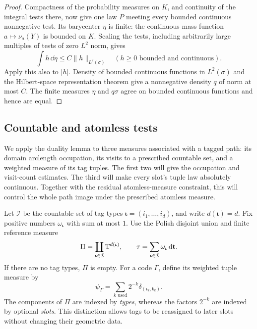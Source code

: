 \begin{proof}
Compactness of the probability measures on \(K\), and continuity of the
integral tests there, now give one law \(P\) meeting every bounded continuous
nonnegative test.  Its barycenter \(\eta\) is finite: the continuous mass
function \(a\mapsto\nu_a(Y)\) is bounded on \(K\).  Scaling the tests,
including arbitrarily large multiples of tests of zero \(L^2\) norm, gives
\[
 \int h\,\dd\eta\le C\|h\|_{L^2(\sigma)}
 \quad(h\ge0\text{ bounded and continuous}).
\]
Apply this also to \(|h|\).  Density of bounded continuous functions in
\(L^2(\sigma)\) and the Hilbert-space representation theorem give a
nonnegative density \(q\) of norm at most \(C\).  The finite measures
\(\eta\) and \(q\sigma\) agree on bounded continuous functions and hence
are equal.
\end{proof}

\subsection{Countable and atomless tests}

We apply the duality lemma to three measures associated with a tagged
path: its domain arclength occupation, its visits to a prescribed
countable set, and a weighted measure of its tag tuples.  The first two
will give the occupation and visit-count estimates.  The third will make
every slot's tuple law absolutely continuous.  Together with the residual
atomless-measure constraint, this will control the whole path image under
the prescribed atomless measure.

Let \(\mathcal I\) be the countable set of tag types
\(\boldsymbol\iota=(i_1,\ldots,i_d)\), and write \(d(\boldsymbol\iota)=d\).
Fix positive numbers \(\omega_{\boldsymbol\iota}\) with sum at most \(1\).
Use the Polish disjoint union and finite reference measure
\[
 \Pi=\coprod_{\boldsymbol\iota\in\mathcal I}
          \mathbb T^{d(\boldsymbol\iota)},
 \qquad
 \tau=\sum_{\boldsymbol\iota\in\mathcal I}
          \omega_{\boldsymbol\iota}\,\mathrm d\mathbf t.
\]
If there are no tag types, \(\Pi\) is empty.  For a code \(\Gamma\), define
its weighted tuple measure by
\begin{equation}\label{eq:weighted-tuple-measure}
 \psi_\Gamma=
 \sum_{k\text{ used}}2^{-k}
       \delta_{(\boldsymbol\iota_k,\mathbf t_k)}.
\end{equation}
The components of \(\Pi\) are indexed by \emph{types}, whereas the factors
\(2^{-k}\) are indexed by optional \emph{slots}.  This distinction allows
tags to be reassigned to later slots without changing their geometric data.

